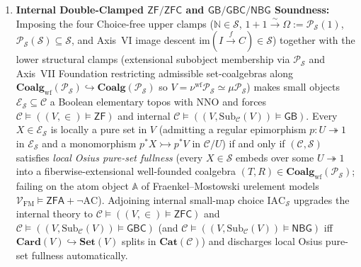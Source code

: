\begin{theorem}
\begin{enumerate}[label=\textup{(\roman*)},leftmargin=1.8em]
  \item \textbf{Internal Double-Clamped $\mathsf{ZF}/\mathsf{ZFC}$ and $\mathsf{GB}/\mathsf{GBC}/\mathsf{NBG}$ Soundness:} Imposing the four Choice-free upper clamps ($\mathbb{N} \in \mathcal{S}$, $1 + 1 \xrightarrow{\sim} \Omega := \mathcal{P}_{\mathcal{S}}(1)$, $\mathcal{P}_{\mathcal{S}}(\mathcal{S}) \subseteq \mathcal{S}$, and Axis~VI image descent $\mathrm{im}(I \xrightarrow{f} C) \in \mathcal{S}$) together with the lower structural clamps (extensional subobject membership via $\mathcal{P}_{\mathcal{S}}$ and Axis~VII Foundation restricting admissible set-coalgebras along $\mathbf{Coalg}_{\mathrm{wf}}(\mathcal{P}_{\mathcal{S}}) \hookrightarrow \mathbf{Coalg}(\mathcal{P}_{\mathcal{S}})$ so $V = \nu^{\mathrm{wf}} \mathcal{P}_{\mathcal{S}} \simeq \mu \mathcal{P}_{\mathcal{S}}$) makes small objects $\mathcal{E}_{\mathcal{S}} \subseteq \mathcal{C}$ a Boolean elementary topos with $\mathrm{NNO}$ and forces $\mathcal{C} \models ((V, \in) \models \mathsf{ZF})$ and internal $\mathcal{C} \models ((V, \mathrm{Sub}_{\mathcal{C}}(V)) \models \mathsf{GB})$. Every $X \in \mathcal{E}_{\mathcal{S}}$ is locally a pure set in $V$ (admitting a regular epimorphism $p : U \twoheadrightarrow 1$ in $\mathcal{E}_{\mathcal{S}}$ and a monomorphism $p^* X \rightarrowtail p^* V$ in $\mathcal{C}/U$) if and only if $(\mathcal{C}, \mathcal{S})$ satisfies \emph{local Osius pure-set fullness} (every $X \in \mathcal{S}$ embeds over some $U \twoheadrightarrow 1$ into a fiberwise-extensional well-founded coalgebra $(T, R) \in \mathbf{Coalg}_{\mathrm{wf}}(\mathcal{P}_{\mathcal{S}})$; failing on the atom object $\mathbb{A}$ of Fraenkel--Mostowski urelement models $\mathcal{V}_{\mathrm{FM}} \models \mathsf{ZFA} + \neg\mathrm{AC}$). Adjoining internal small-map choice $\mathrm{IAC}_{\mathcal{S}}$ upgrades the internal theory to $\mathcal{C} \models ((V, \in) \models \mathsf{ZFC})$ and $\mathcal{C} \models ((V, \mathrm{Sub}_{\mathcal{C}}(V)) \models \mathsf{GBC})$ (and $\mathcal{C} \models ((V, \mathrm{Sub}_{\mathcal{C}}(V)) \models \mathsf{NBG})$ iff $\mathbf{Card}(V) \hookrightarrow \mathbf{Set}(V)$ splits in $\mathbf{Cat}(\mathcal{C})$) and discharges local Osius pure-set fullness automatically.

\end{enumerate}
\end{theorem}
